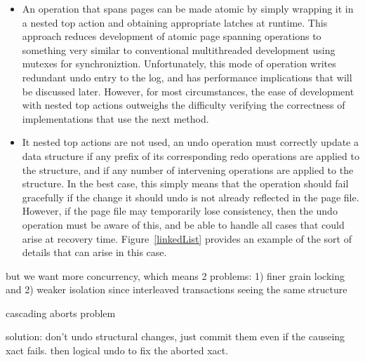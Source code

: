 \documentclass[letterpaper,twocolumn,english]{article}
\begin{document}
\begin{itemize}
\item An operation that spans pages can be made atomic by simply
wrapping it in a nested top action and obtaining appropriate latches
at runtime.  This approach reduces development of atomic page spanning
operations to something very similar to conventional multithreaded
development using mutexes for synchroniztion.  Unfortunately, this
mode of operation writes redundant undo entry to the log, and has
performance implications that will be discussed later.  However, for
most circumstances, the ease of development with nested top actions
outweighs the difficulty verifying the correctness of implementations
that use the next method.

\item It nested top actions are not used, an undo operation must
correctly update a data structure if any prefix of its corresponding
redo operations are applied to the structure, and if any number of
intervening operations are applied to the structure.  In the best
case, this simply means that the operation should fail gracefully if
the change it should undo is not already reflected in the page file.
However, if the page file may temporarily lose consistency, then the
undo operation must be aware of this, and be able to handle all cases
that could arise at recovery time.  Figure~\ref{linkedList} provides
an example of the sort of details that can arise in this case.
\end{itemize}



but we want more concurrency, which means 2 problems: 1) finer grain locking and 2) weaker isolation since interleaved transactions seeing the same structure

cascading aborts problem

solution: don't undo structural changes, just commit them even if the causeing xact fails. then logical undo to fix the aborted xact.

\end{document}
